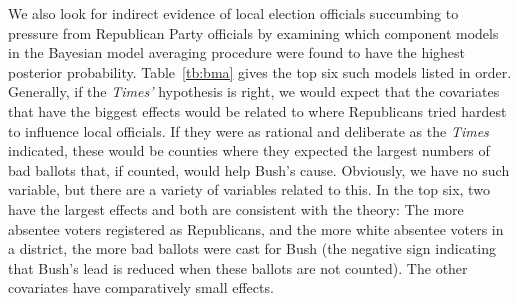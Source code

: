 \documentclass[11pt,titlepage]{article}
\begin{document}
We also look for indirect evidence of local election officials
succumbing to pressure from Republican Party officials by examining
which component models in the Bayesian model averaging procedure were
found to have the highest posterior probability.  Table~\ref{tb:bma}
gives the top six such models listed in order.  Generally, if the
\emph{Times'} hypothesis is right, we would expect that the covariates
that have the biggest effects would be related to where
Republicans tried hardest to influence local officials.  If they were
as rational and deliberate as the \emph{Times} indicated, these would
be counties where they expected the largest numbers of bad ballots
that, if counted, would help Bush's cause.  Obviously, we have no such
variable, but there are a variety of variables related to this.  In
the top six, two have the largest effects and both are consistent with
the theory: The more absentee voters registered as Republicans, and the
more white absentee voters in a district, the more bad ballots
were cast for Bush (the negative sign indicating that Bush's lead is
reduced when these ballots are not counted).  The other covariates
have comparatively small effects.
\end{document}
